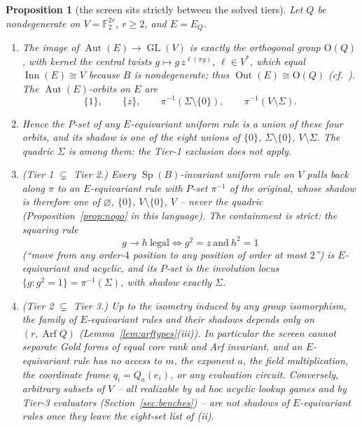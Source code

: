 \documentclass[11pt]{article}
\theoremstyle{plain}
\newtheorem{proposition}{Proposition}
\theoremstyle{definition}
\newcommand{\F}{\mathbb{F}}
\newcommand{\Arf}{\operatorname{Arf}}
\newcommand{\Sp}{\operatorname{Sp}}
\newcommand{\Orth}{\mathrm{O}}
\newcommand{\GL}{\operatorname{GL}}
\newcommand{\Aut}{\operatorname{Aut}}
\newcommand{\Inn}{\operatorname{Inn}}
\newcommand{\Out}{\operatorname{Out}}
\begin{document}
\begin{proposition}[the screen sits strictly between the solved tiers]\label{prop:between}
Let $Q$ be nondegenerate on $V=\F_2^{2r}$, $r\geq2$, and $E=E_Q$.
\begin{enumerate}[label=(\roman*),leftmargin=*]
\item The image of $\Aut(E)\to \GL(V)$ is exactly the
orthogonal group $\Orth(Q)$, with kernel the central twists
$g\mapsto g\,z^{\ell(\pi g)}$, $\ell\in V^{*}$, which equal
$\Inn(E)\cong V$ because $B$ is nondegenerate; thus
$\Out(E)\cong \Orth(Q)$ (cf.~\cite{Winter72}). The
$\Aut(E)$-orbits on $E$ are
\[
\{1\},\qquad \{z\},\qquad \pi^{-1}(\Sigma\setminus\{0\}),\qquad
\pi^{-1}(V\setminus\Sigma).
\]
\item Hence the $P$-set of any $E$-equivariant uniform rule is a union of
these four orbits, and its shadow is one of the eight unions of $\{0\}$,
$\Sigma\setminus\{0\}$, $V\setminus\Sigma$. The quadric $\Sigma$ is among
them: the Tier-1 exclusion does not apply.
\item (Tier 1 $\subsetneq$ Tier 2.) Every $\Sp(B)$-invariant
uniform rule on $V$ pulls back along $\pi$ to an $E$-equivariant rule with
$P$-set $\pi^{-1}$ of the original, whose shadow is therefore one of
$\varnothing$, $\{0\}$, $V\setminus\{0\}$, $V$ -- never the quadric
(Proposition~\ref{prop:nogo} in this language). The containment is strict:
the \emph{squaring rule}
\[
g\to h\ \text{legal}\iff g^2=z\ \text{and}\ h^2=1
\]
(``move from any order-$4$ position to any position of order at most
$2$'') is $E$-equivariant and acyclic, and its $P$-set is the involution
locus $\{g:g^2=1\}=\pi^{-1}(\Sigma)$, with shadow exactly $\Sigma$.
\item (Tier 2 $\subsetneq$ Tier 3.) Up to the isometry induced by any group
isomorphism, the family of $E$-equivariant rules and their shadows depends
only on $(r,\Arf Q)$ (Lemma~\ref{lem:arftypes}(iii)). In particular the
screen cannot separate Gold forms of equal core rank and Arf invariant, and
an $E$-equivariant rule has no access to $m$, the exponent $a$, the field
multiplication, the coordinate frame $q_i=Q_a(e_i)$, or any evaluation
circuit. Conversely, arbitrary subsets of $V$ -- all realizable by ad hoc
acyclic lookup games and by Tier-3 evaluators
(Section~\ref{sec:benches}) -- are not shadows of $E$-equivariant rules once
they leave the eight-set list of (ii).
\end{enumerate}
\end{proposition}
\end{document}
